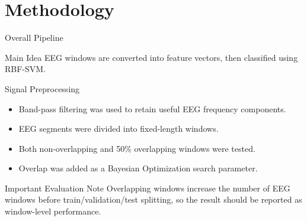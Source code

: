 \documentclass[10pt,aspectratio=169]{beamer}
\begin{document}
\section{Methodology}

\begin{frame}{Overall Pipeline}
  \centering

  \vspace{0.5cm}
  \begin{block}{Main Idea}
    EEG windows are converted into feature vectors, then classified using RBF-SVM.
  \end{block}
\end{frame}

\begin{frame}{Signal Preprocessing}
  \begin{itemize}
    \item Band-pass filtering was used to retain useful EEG frequency components.
    \item EEG segments were divided into fixed-length windows.
    \item Both non-overlapping and 50\% overlapping windows were tested.
    \item Overlap was added as a Bayesian Optimization search parameter.
  \end{itemize}

  \begin{block}{Important Evaluation Note}
    Overlapping windows increase the number of EEG windows before train/validation/test splitting, so the result should be reported as window-level performance.
  \end{block}
\end{frame}
\end{document}
